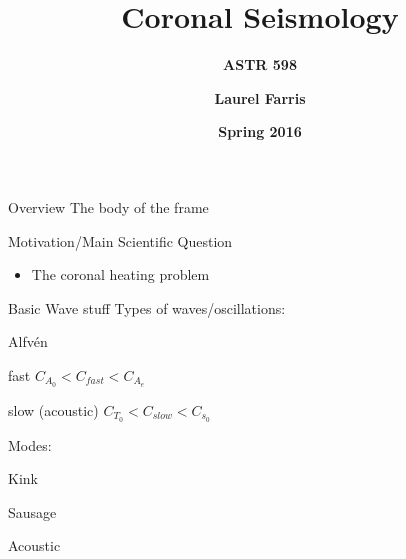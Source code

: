 \documentclass[table]{beamer}
\title{\textbf{Coronal Seismology}}
\subtitle{\textbf{ASTR 598}}
\date{\textbf{Spring 2016}}
\author{\textbf{Laurel Farris}}
\begin{document}
{
\begin{frame}
    \titlepage
\end{frame}}

\begin{frame}{Overview}
    The body of the frame
\end{frame}

\begin{frame}{Motivation/Main Scientific Question}
    \begin{itemize}
        \item The coronal heating problem
    \end{itemize}
\end{frame}

\begin{frame}{Basic Wave stuff}
    Types of waves/oscillations:
    \begin{itemize*}
        \item Alfv\'en
        \item fast $C_{A_0} < C_{fast} < C_{A_e} $
        \item slow (acoustic) $C_{T_0} < C_{slow} < C_{s_0} $
    \end{itemize*}
    Modes:
    \begin{itemize*}
        \item Kink
        \item Sausage
        \item Acoustic
    \end{itemize*}
\end{frame}
\end{document}
